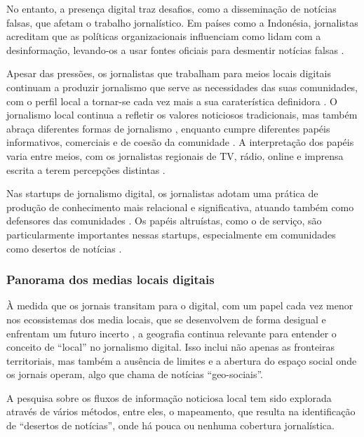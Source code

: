 \documentclass[portuguese]{textolivre}
\begin{document}
No entanto, a presença digital traz desafios, como a disseminação de notícias falsas, que afetam o trabalho jornalístico. Em países como a Indonésia, jornalistas acreditam que as políticas organizacionais influenciam como lidam com a desinformação, levando-os a usar fontes oficiais para desmentir notícias falsas \cite{kwanda2020}.

Apesar das pressões, os jornalistas que trabalham para meios locais digitais continuam a produzir jornalismo que serve as necessidades das suas comunidades, com o perfil local a tornar-se cada vez mais a sua caraterística definidora \cite{sjovaag2015}. O jornalismo local continua a refletir os valores noticiosos tradicionais, mas também abraça diferentes formas de jornalismo \cite{jenkins2020b}, enquanto cumpre diferentes papéis informativos, comerciais e de coesão da comunidade \cite{matthews2023}. A interpretação dos papéis varia entre meios, com os jornalistas regionais de TV, rádio, online e imprensa escrita a terem percepções distintas \cite{fisher2022}.

Nas startups de jornalismo digital, os jornalistas adotam uma prática de produção de conhecimento mais relacional e significativa, atuando também como defensores das comunidades \cite{anderson2023}. Os papéis altruístas, como o de serviço, são particularmente importantes nessas startups, especialmente em comunidades como desertos de notícias \cite{finneman2022}.


\subsubsection{Panorama dos medias locais digitais}
À medida que os jornais transitam para o digital, com um papel cada vez menor nos ecossistemas dos media locais, que se desenvolvem de forma desigual e enfrentam um futuro incerto \cite{nielsen2015}, a geografia continua relevante para entender o conceito de “local” no jornalismo digital. Isso inclui não apenas as fronteiras territoriais, mas também a ausência de limites e a abertura do espaço social onde os jornais operam, algo que \textcite{hess2013} chama de notícias “geo-sociais”.

A pesquisa sobre os fluxos de informação noticiosa local tem sido explorada através de vários métodos, entre eles, o mapeamento, que resulta na identificação de “desertos de notícias”, onde há pouca ou nenhuma cobertura jornalística.
\end{document}
